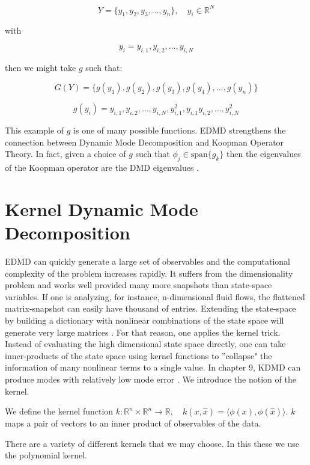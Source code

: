 $$
Y = \{y_1, y_2, y_3, \dots, y_n  \}, \quad y_i \in \mathbb{R}^{N}
$$

\noindent with 

$$
y_i = {y_{i,1}, y_{i,2},\dots, y_{i,N}} 
$$

\noindent then we might take $g$ such that:

$$
G(Y) = \{g(y_1), g(y_2), g(y_3), g(y_4), \dots , g(y_n)\}
$$

$$
g(y_i) = {y_{i,1}, y_{i,2},\dots, y_{i,N}, y^{2}_{i,1}, y_{i,1}y_{i,2}, \dots, y^{2}_{i,N}} 
$$

 This example of $g$ is one of many possible functions. EDMD strengthens the connection 
between Dynamic Mode Decomposition and Koopman Operator Theory. In fact, given a 
choice of $g$ such that $\phi_j \in \text{span}\{g_k\}$ then the eigenvalues of the 
Koopman operator are the DMD eigenvalues \cite{doi:10.1137/1.9781611974508}.

\section{Kernel Dynamic Mode Decomposition}

EDMD can quickly generate a large set of observables
 and the computational complexity of the problem increases rapidly. It suffers from the
 dimensionality problem and works well provided many more snapshots than state-space
variables. If one is analyzing, for instance, n-dimensional fluid flows, the flattened matrix-snapshot
can easily have thousand of entries. Extending the state-space by building a dictionary with nonlinear combinations of the 
state space will generate very large matrices \cite{williams2015kernelbased}. For that reason, one applies the kernel trick. Instead of evaluating
the high dimensional state space directly, one can take inner-products of the state space using kernel functions
to ''collapse" the information of many nonlinear terms to a single value. 
 In chapter 9, KDMD can produce modes with relatively low mode error \cite{doi:10.1137/1.9781611974508}. 
We introduce the notion of the kernel.

\begin{dfn}
    We define the kernel function $k:\mathbb{R}^n \times \mathbb{R}^n \rightarrow \mathbb{R}, \quad k(x,{\hat x}) = \langle \phi(x), \phi({\hat x})\rangle$.
    $k$ maps a pair of vectors to an inner product of observables of the data.
\end{dfn}

\noindent There are a variety of different kernels that we may choose. In this these we use the polynomial kernel.

